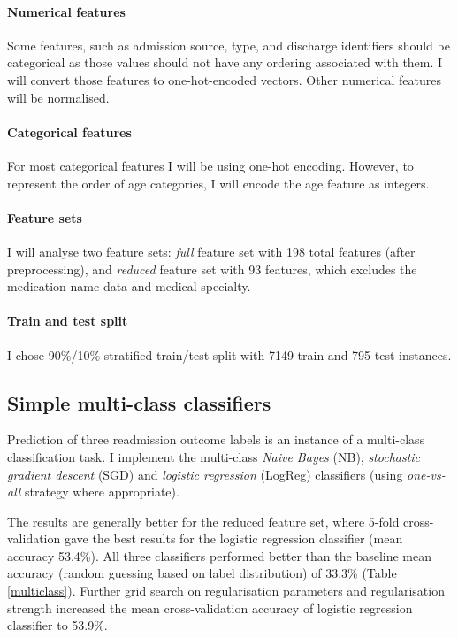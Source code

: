 \documentclass[10pt, twocolumn]{article}
\begin{document}
\paragraph{Numerical features} Some features, such as admission source, type, and discharge identifiers should be categorical as those values should not have any ordering associated with them. I will convert those features to one-hot-encoded vectors. Other numerical features will be normalised.

\paragraph{Categorical features} For most categorical features I will be using one-hot encoding. However, to represent the order of age categories, I will encode the age feature as integers.

\paragraph{Feature sets} I will analyse two feature sets: \textit{full} feature set with 198 total features (after preprocessing), and \textit{reduced} feature set with 93 features, which excludes the medication name data and medical specialty. 

\paragraph{Train and test split} I chose 90\%/10\% stratified train/test split with 7149 train and 795 test instances.

\subsection{Simple multi-class classifiers}
Prediction of three readmission outcome labels is an instance of a multi-class classification task. I implement the multi-class \textit{Naive Bayes} (NB), \textit{stochastic gradient descent} (SGD) and \textit{logistic regression}  (LogReg) classifiers (using \textit{one-vs-all} strategy where appropriate).

The results are generally better for the reduced feature set, where 5-fold cross-validation gave the best results for the logistic regression classifier (mean accuracy 53.4\%). All three classifiers performed better than the baseline mean accuracy (random guessing based on label distribution) of 33.3\% (Table \ref{multiclass}). Further grid search on regularisation parameters and regularisation strength increased the mean cross-validation accuracy of logistic regression classifier to 53.9\%.
\end{document}

